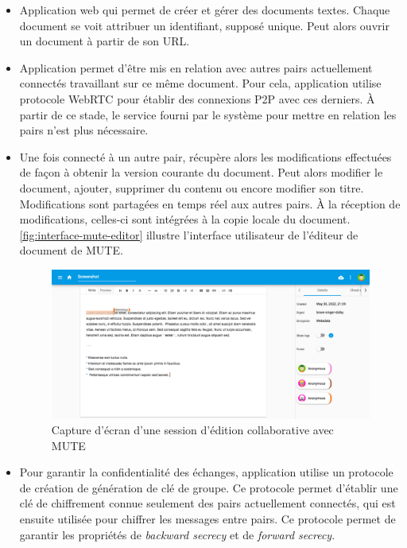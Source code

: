 \begin{itemize}
    \item Application web qui permet de créer et gérer des documents textes.
        Chaque document se voit attribuer un identifiant, supposé unique.
        Peut alors ouvrir un document à partir de son URL.
    \item Application permet d'être mis en relation avec autres pairs actuellement connectés travaillant sur ce même document.
        Pour cela, application utilise protocole WebRTC pour établir des connexions \ac{P2P} avec ces derniers.
        À partir de ce stade, le service fourni par le système pour mettre en relation les pairs n'est plus nécessaire.
    \item Une fois connecté à un autre pair, récupère alors les modifications effectuées de façon à obtenir la version courante du document.
        Peut alors modifier le document, \ie ajouter, supprimer du contenu ou encore modifier son titre.
        Modifications sont partagées en temps réel aux autres pairs.
        À la réception de modifications, celles-ci sont intégrées à la copie locale du document.
        \autoref{fig:interface-mute-editor} illustre l'interface utilisateur de l'éditeur de document de MUTE.
        \begin{figure}[!ht]
            \centering
            \includegraphics[width=\linewidth]{img/screenshot-mute-editor.png}
            \caption{Capture d'écran d'une session d'édition collaborative avec MUTE}
            \label{fig:interface-mute-editor}
        \end{figure}
    \item Pour garantir la confidentialité des échanges, application utilise un protocole de création de génération de clé de groupe.
        Ce protocole permet d'établir une clé de chiffrement connue seulement des pairs actuellement connectés, qui est ensuite utilisée pour chiffrer les messages entre pairs.
        Ce protocole permet de garantir les propriétés de \emph{backward secrecy} et de \emph{forward secrecy}.

\end{itemize}
